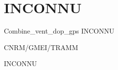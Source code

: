%
\section{INCONNU}

 {\sf Combine\_vent\_dop\_gps}
INCONNU

\bigskip





CNRM/GMEI/TRAMM

INCONNU

